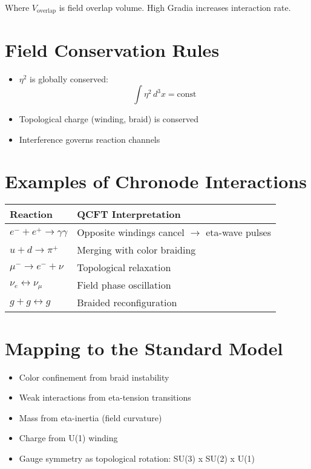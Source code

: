 \documentclass[12pt]{article}
\begin{document}
Where $V_{\text{overlap}}$ is field overlap volume. High Gradia increases interaction rate.

\section{Field Conservation Rules}

\begin{itemize}
\item $\eta^2$ is globally conserved:
\[
\int \eta^2 \, d^3x = \text{const}
\]
\item Topological charge (winding, braid) is conserved
\item Interference governs reaction channels
\end{itemize}

\section{Examples of Chronode Interactions}

\begin{tabular}{@{}ll@{}}
\toprule
Reaction & QCFT Interpretation \\
\midrule
$e^- + e^+ \rightarrow \gamma \gamma$ & Opposite windings cancel $\rightarrow$ eta-wave pulses \\
$u + d \rightarrow \pi^+$ & Merging with color braiding \\
$\mu^- \rightarrow e^- + \nu$ & Topological relaxation \\
$\nu_e \leftrightarrow \nu_\mu$ & Field phase oscillation \\
$g + g \leftrightarrow g$ & Braided reconfiguration \\
\bottomrule
\end{tabular}

\section{Mapping to the Standard Model}

\begin{itemize}
\item Color confinement from braid instability
\item Weak interactions from eta-tension transitions
\item Mass from eta-inertia (field curvature)
\item Charge from U(1) winding
\item Gauge symmetry as topological rotation: SU(3) x SU(2) x U(1)
\end{itemize}
\end{document}
